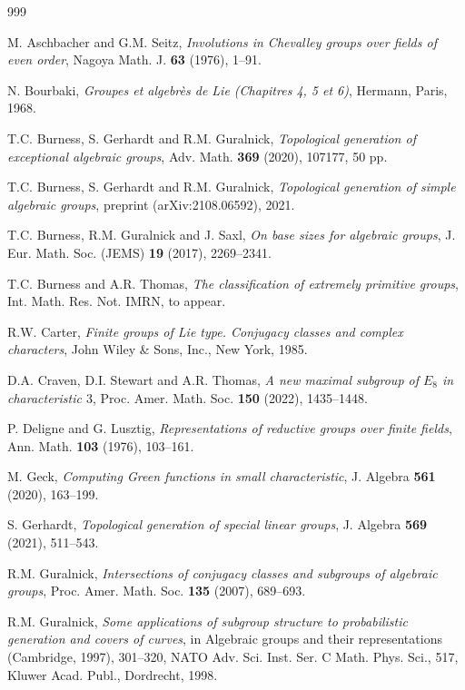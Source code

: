 \documentclass[twoside,a4paper,reqno,11pt]{amsart}
\newcommand{\<}{\langle}
\renewcommand{\>}{\rangle}
\renewcommand{\:}{\colon}
\theoremstyle{plain}
\theoremstyle{definition}
\begin{document}
\begin{thebibliography}{999}

 M. Aschbacher and G.M. Seitz, \emph{Involutions in Chevalley groups over fields of even order}, Nagoya Math. J. \textbf{63} (1976), 1--91.

 N. Bourbaki, \emph{Groupes et algebr\`{e}s de Lie (Chapitres 4, 5 et 6)},
Hermann, Paris, 1968.

 T.C. Burness, S. Gerhardt and R.M. Guralnick, \emph{Topological generation of exceptional algebraic groups}, Adv. Math. \textbf{369} (2020), 107177, 50 pp.

 T.C. Burness, S. Gerhardt and R.M. Guralnick, \emph{Topological generation of simple algebraic groups}, preprint (arXiv:2108.06592), 2021. 

 T.C. Burness, R.M. Guralnick and J. Saxl, \emph{On base sizes for algebraic groups}, J. Eur. Math. Soc. (JEMS) \textbf{19} (2017), 2269--2341.

 T.C. Burness and A.R. Thomas, \emph{The classification of extremely primitive groups}, Int. Math. Res. Not. IMRN, to appear.

R.W. Carter, \emph{Finite groups of Lie type. Conjugacy classes and complex characters}, John Wiley \& Sons, Inc., New York, 1985.

D.A. Craven, D.I. Stewart and A.R. Thomas, \emph{A new maximal subgroup of $E_8$ in characteristic $3$}, Proc. Amer. Math. Soc. \textbf{150} (2022), 1435--1448.

P. Deligne and G. Lusztig, \emph{Representations of reductive groups over finite fields}, Ann. Math. \textbf{103} (1976), 103--161.

M. Geck, \emph{Computing Green functions in small characteristic}, J. Algebra \textbf{561} (2020), 163--199.
 
S. Gerhardt, \emph{Topological generation of special linear groups}, J. Algebra \textbf{569} (2021), 511--543.
 
R.M. Guralnick, \emph{Intersections of conjugacy classes and subgroups of algebraic groups}, Proc. Amer. Math. Soc. \textbf{135} (2007), 689--693.
  
R.M. Guralnick, \emph{Some applications of subgroup structure to probabilistic generation and covers of curves}, in Algebraic groups and their representations (Cambridge, 1997), 301--320, NATO Adv. Sci. Inst. Ser. C Math. Phys. Sci., 517, Kluwer Acad. Publ., Dordrecht, 1998. 
  

\end{thebibliography}
\end{document}
